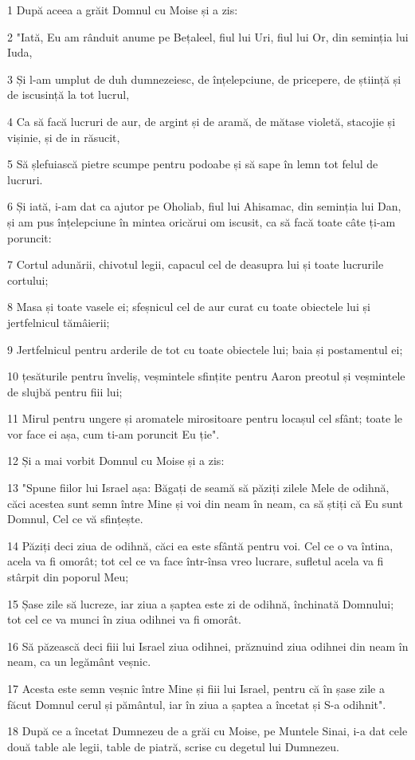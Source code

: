 \par 1 După aceea a grăit Domnul cu Moise și a zis:
\par 2 "Iată, Eu am rânduit anume pe Bețaleel, fiul lui Uri, fiul lui Or, din seminția lui Iuda,
\par 3 Și l-am umplut de duh dumnezeiesc, de înțelepciune, de pricepere, de știință și de iscusință la tot lucrul,
\par 4 Ca să facă lucruri de aur, de argint și de aramă, de mătase violetă, stacojie și vișinie, și de in răsucit,
\par 5 Să șlefuiască pietre scumpe pentru podoabe și să sape în lemn tot felul de lucruri.
\par 6 Și iată, i-am dat ca ajutor pe Oholiab, fiul lui Ahisamac, din seminția lui Dan, și am pus înțelepciune în mintea oricărui om iscusit, ca să facă toate câte ți-am poruncit:
\par 7 Cortul adunării, chivotul legii, capacul cel de deasupra lui și toate lucrurile cortului;
\par 8 Masa și toate vasele ei; sfeșnicul cel de aur curat cu toate obiectele lui și jertfelnicul tămâierii;
\par 9 Jertfelnicul pentru arderile de tot cu toate obiectele lui; baia și postamentul ei;
\par 10 țesăturile pentru înveliș, veșmintele sfințite pentru Aaron preotul și veșmintele de slujbă pentru fiii lui;
\par 11 Mirul pentru ungere și aromatele mirositoare pentru locașul cel sfânt; toate le vor face ei așa, cum ti-am poruncit Eu ție".
\par 12 Și a mai vorbit Domnul cu Moise și a zis:
\par 13 "Spune fiilor lui Israel așa: Băgați de seamă să păziți zilele Mele de odihnă, căci acestea sunt semn între Mine și voi din neam în neam, ca să știți că Eu sunt Domnul, Cel ce vă sfințește.
\par 14 Păziți deci ziua de odihnă, căci ea este sfântă pentru voi. Cel ce o va întina, acela va fi omorât; tot cel ce va face într-însa vreo lucrare, sufletul acela va fi stârpit din poporul Meu;
\par 15 Șase zile să lucreze, iar ziua a șaptea este zi de odihnă, închinată Domnului; tot cel ce va munci în ziua odihnei va fi omorât.
\par 16 Să păzească deci fiii lui Israel ziua odihnei, prăznuind ziua odihnei din neam în neam, ca un legământ veșnic.
\par 17 Acesta este semn veșnic între Mine și fiii lui Israel, pentru că în șase zile a făcut Domnul cerul și pământul, iar în ziua a șaptea a încetat și S-a odihnit".
\par 18 După ce a încetat Dumnezeu de a grăi cu Moise, pe Muntele Sinai, i-a dat cele două table ale legii, table de piatră, scrise cu degetul lui Dumnezeu.

